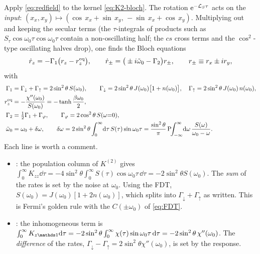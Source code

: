 \begin{exbox}
Apply \cref{eq:redfield} to the kernel \eqref{eq:K2-bloch}.
The rotation $\mathrm{e}^{-\mathcal{L}_S\tau}$ acts on the \emph{input}: $(x_x,x_y)\mapsto(\cos\,x_x+\sin\,x_y,\,-\sin\,x_x+\cos\,x_y)$.
Multiplying out and keeping the secular terms (the $\tau$-integrals of products such as $S_\tau\cos\omega_0\tau\cos\omega_0\tau$ contain a non-oscillating half; the $cs$ cross terms and the $\cos^2$-type oscillating halves drop), one finds the Bloch equations
\begin{equation}
  \dot r_z=-\Gamma_1\big(r_z-r_z^{\rm eq}\big),\qquad
  \dot r_\pm=\big(\pm i\tilde\omega_0-\Gamma_2\big)r_\pm,\qquad r_\pm\equiv r_x\pm ir_y ,
  \label{eq:bloch-eqs}
\end{equation}
with
\begin{align}
  \Gamma_1&=\Gamma_\downarrow+\Gamma_\uparrow=2\sin^2\theta\,S(\omega_0),\qquad
  \Gamma_{\downarrow}=2\sin^2\theta\,J(\omega_0)\big[1+n(\omega_0)\big],\quad
  \Gamma_{\uparrow}=2\sin^2\theta\,J(\omega_0)\,n(\omega_0),
  \label{eq:rates-T1}\\
  r_z^{\rm eq}&=-\frac{\chi''(\omega_0)}{S(\omega_0)}=-\tanh\frac{\beta\omega_0}{2},
  \label{eq:rz-eq}\\
  \Gamma_2&=\tfrac12\Gamma_1+\Gamma_\varphi,\qquad \Gamma_\varphi=2\cos^2\theta\,S(\omega{=}0),
  \label{eq:rates-T2}\\
  \tilde\omega_0&=\omega_0+\delta\omega,\qquad
  \delta\omega=2\sin^2\theta\int_0^\infty\!\mathrm{d}\tau\,S(\tau)\sin\omega_0\tau
  =\frac{\sin^2\theta}{\pi}\,\mathrm P\!\!\int_{-\infty}^{\infty}\!\mathrm{d}\omega\,\frac{S(\omega)}{\omega_0-\omega}.
  \label{eq:lamb}
\end{align}
Each line is worth a comment.
\begin{itemize}[itemsep=1pt]
\item {}: the population column of $K^{(2)}$ gives $\int_0^\infty K_{zz}\dd\tau=-4\sin^2\theta\int_0^\infty S(\tau)\cos\omega_0\tau\,\dd\tau=-2\sin^2\theta S(\omega_0)$.
  The \emph{sum} of the rates is set by the noise at $\omega_0$.
  Using the FDT, $S(\omega_0)=J(\omega_0)[1+2n(\omega_0)]$, which splits into $\Gamma_\downarrow+\Gamma_\uparrow$ as written.
  This is Fermi's golden rule with the $C(\pm\omega_0)$ of \cref{eq:FDT}.
\item {}: the inhomogeneous term is $\int_0^\infty K_{z\Id}\dd\tau=-2\sin^2\theta\int_0^\infty\chi(\tau)\sin\omega_0\tau\,\dd\tau=-2\sin^2\theta\,\chi''(\omega_0)$.
  The \emph{difference} of the rates, $\Gamma_\downarrow-\Gamma_\uparrow=2\sin^2\theta\chi''(\omega_0)$, is set by the response.

\end{itemize}
\end{exbox}
